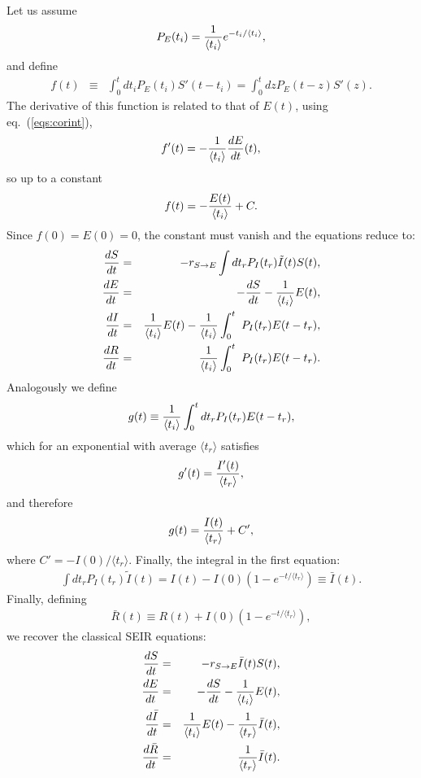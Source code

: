 \documentclass[10pt,letterpaper]{article}
\begin{document}
 Let us assume
\begin{eqnarray}
P_E(t_i) = {1\over \langle t_i\rangle} e^{-t_i/\langle t_i\rangle},
\end{eqnarray}
and define
\begin{eqnarray}
f(t) &\equiv& \int_0^t dt_i P_E(t_i)  S'(t-t_i) = \int_0^t dz P_E(t-z) S'(z).
\end{eqnarray}
The derivative of this function is related to that of $E(t)$, using eq.~(\ref{eqs:corint}),
\begin{eqnarray}
f'(t)  = - {1\over \langle t_i\rangle} {dE\over d t}(t),
\end{eqnarray}
so up to a constant
\begin{eqnarray}
f(t) = -{E(t)\over \langle t_i\rangle} +C.
\end{eqnarray}
Since $f(0) = E(0) =0$, the constant must vanish and the equations reduce to:
\begin{eqnarray}
{d S\over dt} &=& - r_{S\rightarrow E} \int d t_r  P_I(t_r)\tilde{I}(t) S(t),\nonumber\\
{d E\over dt} &=& -{d S\over d t} - {1 \over \langle t_i\rangle} E(t) ,\nonumber\\
{d I\over dt} &=& {1 \over \langle t_i\rangle} E(t) -{1\over \langle t_i\rangle} \int_0^t ~P_I(t_r) E(t-t_r) ,\nonumber\\
{d R\over d t} &=&  {1\over  \langle t_i\rangle} \int_0^t ~P_I(t_r) E(t-t_r).
\end{eqnarray}
Analogously we define
\begin{eqnarray}
g(t) \equiv {1\over \langle t_i\rangle } \int_0^t dt_r P_I(t_r) E(t-t_r),
\end{eqnarray}
which for an exponential with average $\langle t_r\rangle$ satisfies
\begin{eqnarray}
g'(t) =  {I'(t)\over \langle t_r \rangle},
\end{eqnarray}
and therefore
\begin{eqnarray}
g(t) = {I(t)\over \langle t_r \rangle} + C',
\end{eqnarray}
where $C'= -I(0)/\langle t_r \rangle$.
Finally, the integral in the first equation:
\begin{eqnarray}
\int d t_r P_I(t_r) \tilde{I}(t) = I(t) - I(0) \left(1- e^{-t/\langle t_r\rangle}  \right) \equiv \bar{I}(t).
\end{eqnarray}
Finally, defining 
\begin{eqnarray}
\bar{R}(t) \equiv R(t) + I(0) \left(1- e^{-t/\langle t_r\rangle}  \right),
\end{eqnarray}
we recover the classical SEIR equations:
\begin{eqnarray}
{d S\over dt} &=& - r_{S\rightarrow E} \bar{I}(t) S(t),\nonumber\\
{d E\over dt} &=& -{d S\over d t} -{1 \over \langle t_i\rangle} E(t) ,\nonumber\\
{d \bar{I}\over dt} &=& {1 \over \langle t_i\rangle} E(t) - {1\over  \langle t_r \rangle} \bar{I}(t),\nonumber\\
{d \bar{R}\over d t} &=&  {1\over  \langle t_r\rangle} \bar{I}(t).
\label{eqs:seirexp}
\end{eqnarray}
\end{document}
